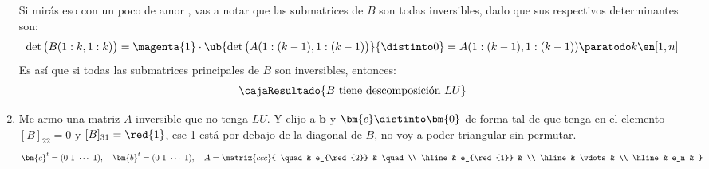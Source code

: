 \begin{enumerate}[label=\alph*)]
        Si mirás eso con un poco de amor {\tiny{}}, vas a notar que las submatrices de $B$ son todas inversibles, dado que sus respectivos determinantes son:
        $$
          \det\big(
          B(1:k,1:k)
          \big) =
          \magenta{1} \cdot
          \ub{
            \det\big(
            A(1: (k-1), 1: (k-1)
            \big)
          }{
            \distinto 0
          }
          =
          A(1: (k-1), 1: (k-1))
          \paratodo k \en [1,n]
        $$
        Es así que si todas las submatrices principales de $B$ son inversibles, entonces:
        $$
          \cajaResultado{
            B \text{ tiene descomposición } LU
          }
        $$

  \item Me armo una matriz $A$ inversible que no tenga $LU$. Y elijo a $\bm{b}$ y $\bm{c} \distinto \bm{0}$
        de forma tal de que tenga en el elemento $[B]_{22} = 0$ y $[B]_{31} = \red{1}$, ese 1 está por debajo de la diagonal de $B$,
        no voy a poder triangular sin permutar.
        $$
          \bm{c}^t = (0 ~ 1 ~ \cdots ~ 1),
          \quad
          \bm{b}^t = (0 ~ 1 ~ \cdots ~ 1),
          \quad
          A =
          \matriz{ccc}{
            \quad & e_{\red{2}} & \quad \\ \hline
            & e_{\red{1}} &  \\ \hline
            & \vdots & \\ \hline
            & e_n &
          }
        $$


\end{enumerate}

